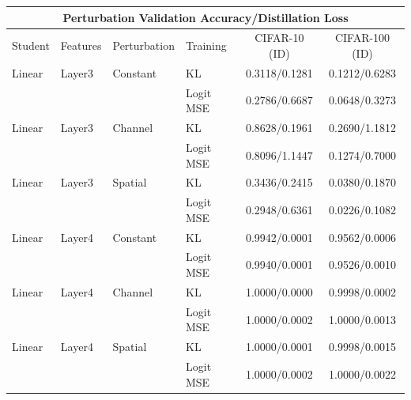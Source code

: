 \documentclass[border=2pt]{standalone}
\begin{document}
\setlength{\tabcolsep}{5pt}
\begin{tabular}{llllcc}
\multicolumn{6}{c}{\textbf{Perturbation Validation Accuracy/Distillation Loss}}\\[4pt]
\toprule
Student & Features & Perturbation & Training & CIFAR-10 (ID) & CIFAR-100 (ID) \\
\midrule
Linear & Layer3 & Constant & KL & 0.3118/0.1281 & 0.1212/0.6283 \\
 &  &  & Logit MSE & 0.2786/0.6687 & 0.0648/0.3273 \\
\midrule
Linear & Layer3 & Channel & KL & 0.8628/0.1961 & 0.2690/1.1812 \\
 &  &  & Logit MSE & 0.8096/1.1447 & 0.1274/0.7000 \\
\midrule
Linear & Layer3 & Spatial & KL & 0.3436/0.2415 & 0.0380/0.1870 \\
 &  &  & Logit MSE & 0.2948/0.6361 & 0.0226/0.1082 \\
\midrule
Linear & Layer4 & Constant & KL & 0.9942/0.0001 & 0.9562/0.0006 \\
 &  &  & Logit MSE & 0.9940/0.0001 & 0.9526/0.0010 \\
\midrule
Linear & Layer4 & Channel & KL & 1.0000/0.0000 & 0.9998/0.0002 \\
 &  &  & Logit MSE & 1.0000/0.0002 & 1.0000/0.0013 \\
\midrule
Linear & Layer4 & Spatial & KL & 1.0000/0.0001 & 0.9998/0.0015 \\
 &  &  & Logit MSE & 1.0000/0.0002 & 1.0000/0.0022 \\
\bottomrule
\end{tabular}
\end{document}
